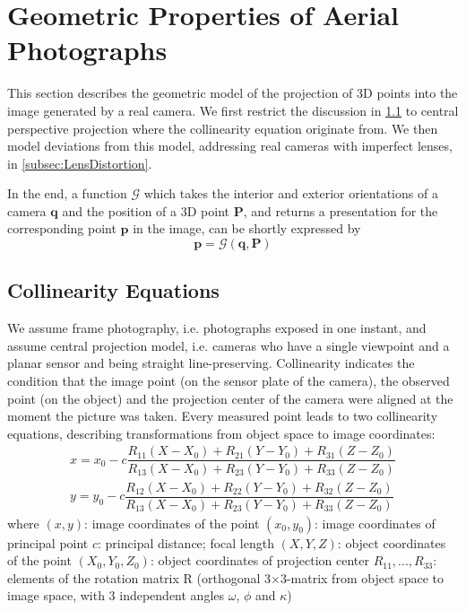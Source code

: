 \section{Geometric Properties of Aerial Photographs}
\label{sec:Geometry}

This section describes the geometric model of the projection of 3D points into the image generated by a real camera. We first restrict the discussion in \cref{subsec:Collinearity} to central perspective projection where the collinearity equation originate from. We then model deviations from this model, addressing real cameras with imperfect lenses, in \cref{subsec:LensDistortion}.

In the end, a function $\mathcal{G}$ which takes the interior and exterior orientations of a camera $\mathbf{q}$ and the position of a 3D point $\mathbf{P}$, and returns a presentation for the corresponding point $\mathbf{p}$ in the image, can be shortly expressed by
\begin{equation} \label{eq:Gfunction}
\mathbf{p} = \mathcal{G}(\mathbf{q},\mathbf{P}) 
\end{equation}

\subsection{Collinearity Equations}
\label{subsec:Collinearity}
We assume frame photography, i.e. photographs exposed in one instant, and assume central projection model, i.e. cameras who have a single viewpoint and a planar sensor and being straight line-preserving. Collinearity indicates the condition that the image point (on the sensor plate of the camera), the observed point (on the object) and the projection center of the camera were aligned at the moment the picture was taken. Every measured point leads to two collinearity equations, describing transformations from object space to image coordinates:
\begin{equation} \label{eq:collinearity}
\begin{split}
x = x_0 -c \dfrac {R_{11}(X-X_0) + R_{21}(Y-Y_0) + R_{31}(Z-Z_0)} {R_{13}(X-X_0) + R_{23}(Y-Y_0) + R_{33}(Z-Z_0)} \\
y = y_0 -c \dfrac {R_{12}(X-X_0) + R_{22}(Y-Y_0) + R_{32}(Z-Z_0)} {R_{13}(X-X_0) + R_{23}(Y-Y_0) + R_{33}(Z-Z_0)}
\end{split}
\end{equation}
where\newline
$(x, y)$: image coordinates of the point \newline
$(x_0, y_0)$: image coordinates of principal point \newline
$c$: principal distance; focal length \newline
$(X, Y, Z)$: object coordinates of the point \newline
$(X_0, Y_0, Z_0)$: object coordinates of projection center \newline
$R_{11},...,R_{33}$: elements of the rotation matrix R (orthogonal 3$\times$3-matrix from object space to image space, with 3 independent angles $\omega$, $\phi$ and $\kappa$)

